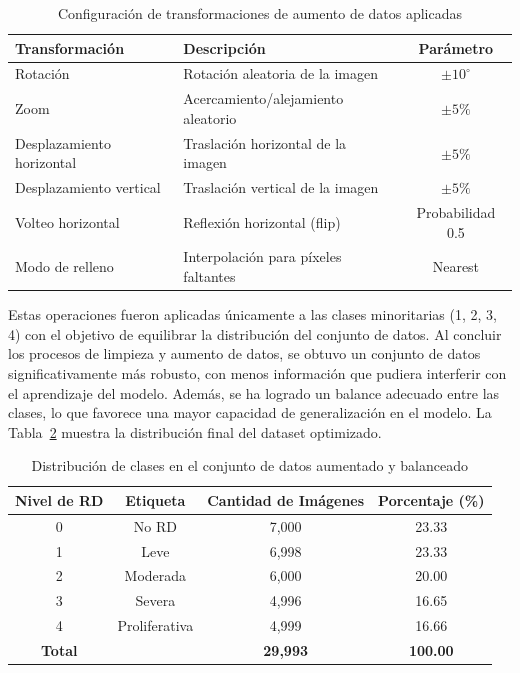 \begin{table}[H]
\centering
\renewcommand{\arraystretch}{1.3}
\caption{Configuración de transformaciones de aumento de datos aplicadas}
\label{tab:data-augmentation}
\begin{tabularx}{\textwidth}{l X c}
\hline
\textbf{Transformación} & \textbf{Descripción} & \textbf{Parámetro} \\ \hline
Rotación & Rotación aleatoria de la imagen & $\pm 10^\circ$ \\
Zoom & Acercamiento/alejamiento aleatorio & $\pm 5\%$ \\
Desplazamiento horizontal & Traslación horizontal de la imagen & $\pm 5\%$ \\
Desplazamiento vertical & Traslación vertical de la imagen & $\pm 5\%$ \\
Volteo horizontal & Reflexión horizontal (flip) & Probabilidad 0.5 \\
Modo de relleno & Interpolación para píxeles faltantes & Nearest \\ \hline
\end{tabularx}
\end{table}

Estas operaciones fueron aplicadas únicamente a las clases minoritarias (1, 2, 3, 4) con el objetivo de equilibrar la distribución del conjunto de datos. Al concluir los procesos de limpieza y aumento de datos, se obtuvo un conjunto de datos significativamente más robusto, con menos información que pudiera interferir con el aprendizaje del modelo. Además, se ha logrado un balance adecuado entre las clases, lo que favorece una mayor capacidad de generalización en el modelo. La Tabla~\ref{tab:clases_aumentadas} muestra la distribución final del dataset optimizado.

\begin{table}[H]
	\centering
	\renewcommand{\arraystretch}{1.5}
	\caption{Distribución de clases en el conjunto de datos aumentado y balanceado}
	\label{tab:clases_aumentadas}
	\begin{tabular}{c c c c}
		\hline
		\textbf{Nivel de RD} & \textbf{Etiqueta} & \textbf{Cantidad de Imágenes} & \textbf{Porcentaje (\%)} \\
		\hline
		0 & No RD & 7,000 & 23.33 \\
		1 & Leve & 6,998 & 23.33 \\
		2 & Moderada & 6,000 & 20.00 \\
		3 & Severa & 4,996 & 16.65 \\
		4 & Proliferativa & 4,999 & 16.66 \\
		\hline
		\textbf{Total} & & \textbf{29,993} & \textbf{100.00} \\
		\hline
	\end{tabular}
\end{table}

